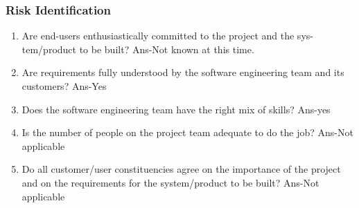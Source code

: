 \documentclass[12pt]{report}
\begin{document}
\subsubsection{Risk Identification}
\justifying
\setlength{\parindent}{4em}
\setlength{\parskip}{0.5em}
\renewcommand{\baselinestretch}{1.5}
\vspace{0.1cm}
\begin{enumerate}
\item Are end-users enthusiastically committed to the project and the sys- tem/product to be built?
Ans-Not known at this time.
\item Are requirements fully understood by the software engineering team and its customers?
Ans-Yes
\item Does the software engineering team have the right mix of skills? Ans-yes
\item Is the number of people on the project team adequate to do the job? Ans-Not applicable
\item Do all customer/user constituencies agree on the importance of the project and on the requirements for the system/product to be built?
Ans-Not applicable
\end{enumerate}
\end{document}
